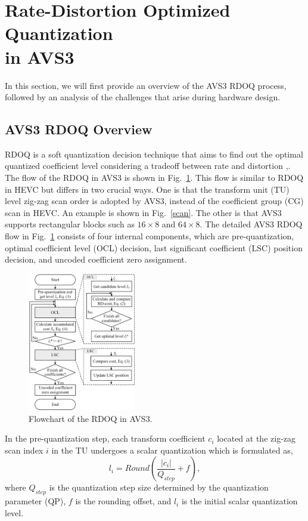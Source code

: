 \documentclass[lettersize,journal]{IEEEtran}
\begin{document}
\section{Rate-Distortion Optimized Quantization \\ in AVS3}
\label{sec:2}
In this section, we will first provide an overview of the AVS3 RDOQ process, followed by an analysis of the challenges that arise during hardware design. 
\subsection{AVS3 RDOQ Overview}
\label{sec:2A}
RDOQ is a soft quantization decision technique that aims to find out the optimal quantized coefficient level considering a tradeoff between rate and distortion  \cite{zhao2023scanline},\cite{huang2023rate}. The flow of the RDOQ in AVS3 is shown in Fig.~\ref{rdoq process}. This flow is similar to RDOQ in HEVC \cite{cui2017Laplacedistributionbased} but differs in two crucial ways. One is that the transform unit (TU) level zig-zag scan order is adopted by AVS3, instead of the coefficient group (CG) scan in HEVC. An example is shown in Fig.~\ref{scan}. The other is that AVS3 supports rectangular blocks such as $16\times8$ and $64\times8$. The detailed AVS3 RDOQ flow in Fig.~\ref{rdoq process} consists of four internal components, which are pre-quantization, optimal coefficient level (OCL) decision, last significant coefficient (LSC) position decision, and uncoded coefficient zero assignment. 
\par
\begin{figure}[!h]
	\centering
	\centerline{\includegraphics[width=0.42\textwidth]{figure/OriRDOQ.png}} 
	\caption{Flowchart of the RDOQ in AVS3.}
	\label{rdoq process} %
\end{figure}
In the pre-quantization step, each transform coefficient $c_{i}$ located at the zig-zag scan index $i$ in the TU undergoes a scalar quantization which is formulated as, 
\begin{equation}
\label{round}
l _{i} = Round\left ( \frac{\left | c_{i}  \right | }{Q_{step} } +  f \right ),
\end{equation}
where $Q_{step}$ is the quantization step size determined by the quantization parameter (QP), $f$ is the rounding offset, and $l _{i}$ is the initial scalar quantization level. 
\end{document}
